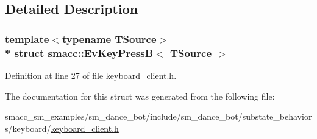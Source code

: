 \subsection{Detailed Description}
\subsubsection*{template$<$typename T\+Source$>$\\*
struct smacc\+::\+Ev\+Key\+Press\+B$<$ T\+Source $>$}



Definition at line 27 of file keyboard\+\_\+client.\+h.



The documentation for this struct was generated from the following file\+:\begin{DoxyCompactItemize}
\item 
smacc\+\_\+sm\+\_\+examples/sm\+\_\+dance\+\_\+bot/include/sm\+\_\+dance\+\_\+bot/substate\+\_\+behaviors/keyboard/\hyperlink{keyboard__client_8h}{keyboard\+\_\+client.\+h}\end{DoxyCompactItemize}
